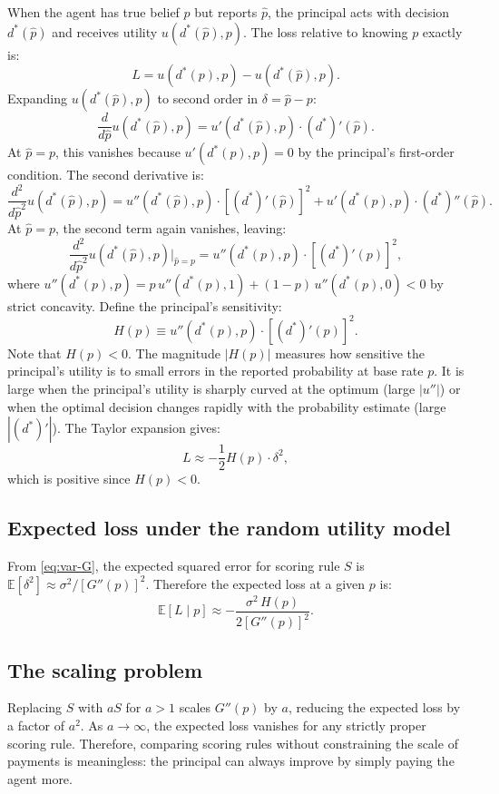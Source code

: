 \documentclass[11pt]{article}
\begin{document}
When the agent has true belief $p$ but reports $\hat{p}$, the principal acts with decision $d^*(\hat{p})$ and receives utility $u(d^*(\hat{p}), p)$. The loss relative to knowing $p$ exactly is:
\[
L = u(d^*(p), p) - u(d^*(\hat{p}), p).
\]
Expanding $u(d^*(\hat{p}), p)$ to second order in $\delta = \hat{p} - p$:
\[
\frac{d}{d\hat{p}} u(d^*(\hat{p}), p) = u'(d^*(\hat{p}), p) \cdot (d^*)'(\hat{p}).
\]
At $\hat{p} = p$, this vanishes because $u'(d^*(p), p) = 0$ by the principal's first-order condition. The second derivative is:
\[
\frac{d^2}{d\hat{p}^2} u(d^*(\hat{p}), p) = u''(d^*(\hat{p}), p) \cdot [(d^*)'(\hat{p})]^2 + u'(d^*(\hat{p}), p) \cdot (d^*)''(\hat{p}).
\]
At $\hat{p} = p$, the second term again vanishes, leaving:
\[
\frac{d^2}{d\hat{p}^2} u(d^*(\hat{p}), p)\bigg|_{\hat{p}=p} = u''(d^*(p), p) \cdot [(d^*)'(p)]^2,
\]
where $u''(d^*(p), p) = p \, u''(d^*(p), 1) + (1-p) \, u''(d^*(p), 0) < 0$ by strict concavity. Define the principal's sensitivity:
\begin{equation}\label{eq:H-def}
H(p) \equiv u''(d^*(p), p) \cdot [(d^*)'(p)]^2.
\end{equation}
Note that $H(p) < 0$. The magnitude $|H(p)|$ measures how sensitive the principal's utility is to small errors in the reported probability at base rate $p$. It is large when the principal's utility is sharply curved at the optimum (large $|u''|$) or when the optimal decision changes rapidly with the probability estimate (large $|(d^*)'|$). The Taylor expansion gives:
\[
L \approx -\frac{1}{2} H(p) \cdot \delta^2,
\]
which is positive since $H(p) < 0$.

\subsection{Expected loss under the random utility model}

From \eqref{eq:var-G}, the expected squared error for scoring rule $S$ is $\mathbb{E}[\delta^2] \approx \sigma^2 / [G''(p)]^2$. Therefore the expected loss at a given $p$ is:
\begin{equation}\label{eq:expected-loss}
\mathbb{E}[L \mid p] \approx -\frac{\sigma^2 \, H(p)}{2 [G''(p)]^2}.
\end{equation}

\subsection{The scaling problem}

Replacing $S$ with $aS$ for $a > 1$ scales $G''(p)$ by $a$, reducing the expected loss by a factor of $a^2$. As $a \to \infty$, the expected loss vanishes for any strictly proper scoring rule. Therefore, comparing scoring rules without constraining the scale of payments is meaningless: the principal can always improve by simply paying the agent more.
\end{document}
